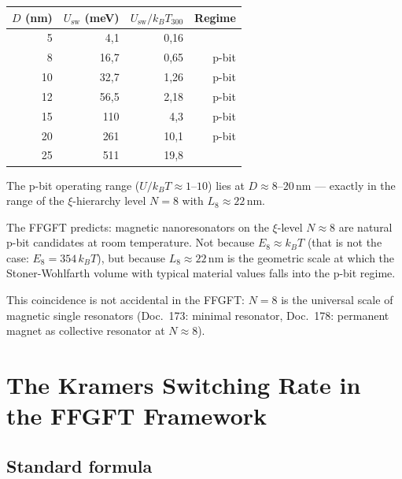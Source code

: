 	\begin{center}
		\begin{tabular}{rrrr}
			\toprule
			$D$ (nm) & $U_\text{sw}$ (meV) & $U_\text{sw}/k_BT_{300}$ & Regime \\
			\midrule
			5  & 4{,}1  & 0{,}16 & \\
			8  & 16{,}7 & 0{,}65 & p-bit \\
			10 & 32{,}7 & 1{,}26 & p-bit \\
			12 & 56{,}5 & 2{,}18 & p-bit \\
			15 & 110    & 4{,}3  & p-bit \\
			20 & 261    & 10{,}1 & p-bit \\
			25 & 511    & 19{,}8 & \\
			\bottomrule
		\end{tabular}
	\end{center}
	
	The p-bit operating range ($U/k_BT \approx 1$--$10$) lies at
	$D \approx 8$--$20\,\text{nm}$ --- exactly in the range of the
	$\xi$-hierarchy level $N = 8$ with $L_8 \approx 22\,\text{nm}$.
	
	\begin{foundation}[Geometric prediction: $N=8$ as natural p-bit anchor]
		The FFGFT predicts: magnetic nanoresonators on the
		$\xi$-level $N \approx 8$ are natural p-bit candidates at
		room temperature. Not because $E_8 \approx k_BT$ (that is not the case:
		$E_8 = 354\,k_BT$), but because $L_8 \approx 22\,\text{nm}$ is the
		geometric scale at which the Stoner-Wohlfarth volume with
		typical material values falls into the p-bit regime.
		
		This coincidence is not accidental in the FFGFT:
		$N=8$ is the universal scale of magnetic single resonators
		(Doc.~173: minimal resonator, Doc.~178: permanent magnet as
		collective resonator at $N\approx8$).
	\end{foundation}
	
	\section{The Kramers Switching Rate in the FFGFT Framework}
	\label{sec:kramers}
	
	\subsection{Standard formula}
	\label{subsec:kramers-standard}
	
